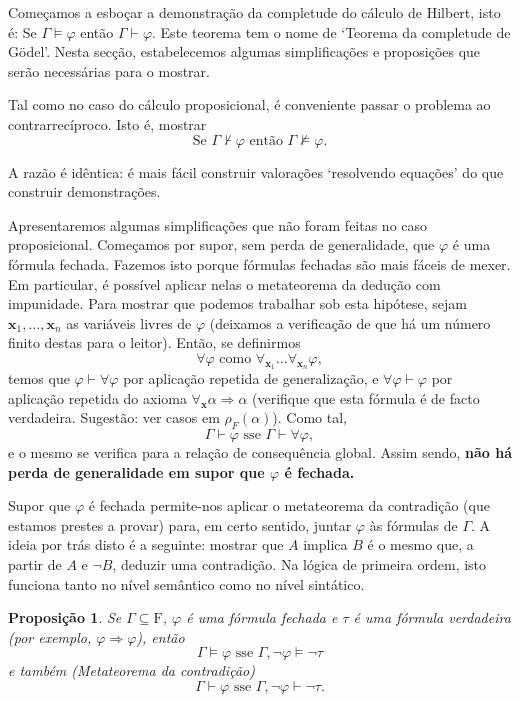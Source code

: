 \documentclass{report}
\newtheorem{prop}{Proposição}
\theoremstyle{definition}
\theoremstyle{remark}
\renewcommand{\bf}[1]{\mathbf{#1}}
\newcommand{\F}{\mathrm{F}}
\newcommand{\imply}{\mathbin{\Rightarrow}}
\begin{document}
	Começamos a esboçar a demonstração da completude do cálculo de Hilbert, isto é: Se $\Gamma \vDash \varphi$ então $\Gamma \vdash \varphi$. Este teorema tem o nome de `Teorema da completude de Gödel'. Nesta secção, estabelecemos algumas simplificações e proposições que serão necessárias para o mostrar.
	
	Tal como no caso do cálculo proposicional, é conveniente passar o problema ao contrarrecíproco. Isto é, mostrar
	\[\text{Se } \Gamma \nvdash \varphi \text{ então } \Gamma \nvDash \varphi.\]
	
	A razão é idêntica: é mais fácil construir valorações `resolvendo equações' do que construir demonstrações.
	
	Apresentaremos algumas simplificações que não foram feitas no caso proposicional. Começamos por supor, sem perda de generalidade, que $\varphi$ é uma fórmula fechada. Fazemos isto porque fórmulas fechadas são mais fáceis de mexer. Em particular, é possível aplicar nelas o metateorema da dedução com impunidade. Para mostrar que podemos trabalhar sob esta hipótese, sejam $\bf x_1, \dots, \bf x_n$ as variáveis livres de $\varphi$ (deixamos a verificação de que há um número finito destas para o leitor). Então, se definirmos
	\[\forall \varphi \text{ como } \forall_{\bf x_1} \dots \forall_{\bf x_n} \varphi,\]
	temos que $\varphi \vdash \forall \varphi$ por aplicação repetida de generalização, e $\forall \varphi \vdash \varphi$ por aplicação repetida do axioma $\forall_{\bf x} \alpha \imply \alpha$ (verifique que esta fórmula é de facto verdadeira. Sugestão: ver casos em $\rho_F(\alpha)$). Como tal,
	\[\Gamma \vdash \varphi \text{ sse } \Gamma \vdash \forall \varphi,\]
	e o mesmo se verifica para a relação de consequência global. Assim sendo, \textbf{não há perda de generalidade em supor que $\varphi$ é fechada.}
	
	Supor que $\varphi$ é fechada permite-nos aplicar o metateorema da contradição (que estamos prestes a provar) para, em certo sentido, juntar $\varphi$ às fórmulas de $\Gamma$. A ideia por trás disto é a seguinte: mostrar que $A$ implica $B$ é o mesmo que, a partir de $A$ e $\neg B$, deduzir uma contradição. Na lógica de primeira ordem, isto funciona tanto no nível semântico como no nível sintático.
	
	\begin{prop}
	Se $\Gamma \subseteq \F$, $\varphi$ é uma fórmula fechada e $\tau$ é uma fórmula verdadeira (por exemplo, $\varphi \imply \varphi$), então
	\[\Gamma \vDash \varphi \text{ sse } \Gamma, \neg \varphi \vDash \neg \tau\]
	e também (Metateorema da contradição)
	\[\Gamma \vdash \varphi \text{ sse } \Gamma, \neg \varphi \vdash \neg \tau.\]
	\end{prop}
	
\end{document}
